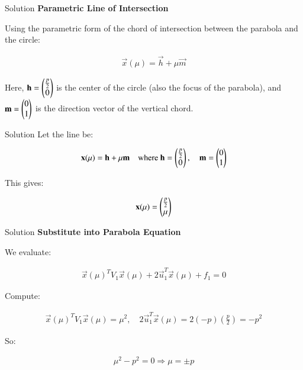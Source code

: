 \documentclass{beamer}
\begin{document}
\begin{frame}{Solution}
\textbf{Parametric Line of Intersection}

Using the parametric form of the chord of intersection between the parabola and the circle:


\begin{align}
\vec{x}(\mu) = \vec{h} + \mu \vec{m}
\end{align}


Here, $\mathbf{h} = \begin{pmatrix}\frac{p}{2} \\ 0\end{pmatrix}$ is the center of the circle (also the focus of the parabola), and $\mathbf{m} = \begin{pmatrix}0 \\ 1\end{pmatrix}$ is the direction vector of the vertical chord.
\end{frame}



\begin{frame}{Solution}
Let the line be:


\begin{align}
\mathbf{x}(\mu) = \mathbf{h} + \mu \mathbf{m}
\quad \text{where } \mathbf{h} = \begin{pmatrix}\frac{p}{2} \\ 0\end{pmatrix}, \quad
\mathbf{m} = \begin{pmatrix}0 \\ 1\end{pmatrix}
\end{align}

This gives:

\begin{align}
\mathbf{x}(\mu) = \begin{pmatrix}\frac{p}{2} \\ \mu\end{pmatrix}
\end{align}
\end{frame}



\begin{frame}{Solution}
\textbf{Substitute into Parabola Equation}

We evaluate:


\begin{align}
\vec{x}(\mu)^T V_1 \vec{x}(\mu) + 2 \vec{u}_1^T \vec{x}(\mu) + f_1 = 0
\end{align}

Compute:


\begin{align}
\vec{x}(\mu)^T V_1 \vec{x}(\mu) = \mu^2, \quad
2 \vec{u}_1^T \vec{x}(\mu) = 2(-p)(\frac{p}{2}) = -p^2
\end{align}



So:


\begin{align}
\mu^2 - p^2 = 0 \Rightarrow \mu = \pm p
\end{align}
\end{frame}
\end{document}
